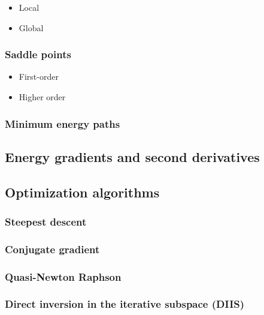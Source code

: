 \documentclass[11pt]{article}
\begin{document}
\begin{itemize}
\item Local
\label{sec:orgd90f59a}

\item Global
\label{sec:orgc76182a}
\end{itemize}

\subsubsection{Saddle points}
\label{sec:org90c993b}

\begin{itemize}
\item First-order
\label{sec:org61dc819}

\item Higher order
\label{sec:org59f6cfc}
\end{itemize}

\subsubsection{Minimum energy paths}
\label{sec:org2176e5b}

\subsection{Energy gradients and second derivatives}
\label{sec:orgdb5270c}

\subsection{Optimization algorithms}
\label{sec:org5a30727}
\subsubsection{Steepest descent}
\label{sec:orgeb81668}

\subsubsection{Conjugate gradient}
\label{sec:org6c2446e}

\subsubsection{Quasi-Newton Raphson}
\label{sec:orgc8e100b}


\subsubsection{Direct inversion in the iterative subspace (DIIS)}
\label{sec:org82cbc14}
\end{document}
